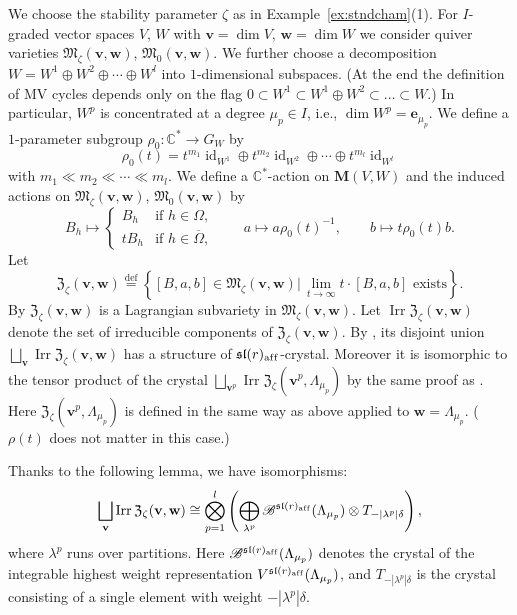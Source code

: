 \documentclass[pdftex]{sigma}
\theoremstyle{definition}
\numberwithin{equation}{section}
\newcommand{\defeq}{\overset{\operatorname{\scriptstyle def}}{=}}
\newcommand{\C}{{\mathbb C}}
\newcommand{\algsl}{\operatorname{\mathfrak{sl}}} %
\newcommand{\id}{\operatorname{id}}
\newcommand{\bM}{{\mathbf M}} %
\newcommand{\M}{{\mathfrak M}} %
\newcommand{\bv}{{\mathbf v}} %
\newcommand{\bw}{{\mathbf w}} %
\newcommand{\be}{{\mathbf e}}
\newcommand{\Irr}{\operatorname{Irr}}
\newcommand{\aff}{\mathrm{af\/f}}
\begin{document}
We choose the stability parameter $\zeta$ as in
Example~\ref{ex:stndcham}(1). For $I$-graded vector spaces $V$, $W$
with $\bv = \dim V$, $\bw = \dim W$ we
consider quiver varieties $\M_\zeta(\bv,\bw)$, $\M_0(\bv,\bw)$. We further
choose a decomposition
$W = W^1\oplus W^2\oplus \cdots \oplus W^l$ into $1$-dimensional
subspaces. (At the end the def\/inition of MV cycles depends only on the
f\/lag $0\subset W^1\subset W^1\oplus W^2 \subset \dots \subset W$.)
In particular, $W^p$ is concentrated at a degree $\mu_p\in I$, i.e.,
$\dim W^p = \be_{\mu_p}$.
%
We def\/ine a $1$-parameter subgroup $\rho_0\colon\C^*\to G_W$ by
\begin{equation*}
  \rho_0(t) = t^{m_1} \id_{W^1} \oplus t^{m_2} \id_{W^2} \oplus\cdots
  \oplus t^{m_l}\id_{W^l}
\end{equation*}
with $m_1 \ll m_2 \ll \cdots \ll m_l$. We def\/ine a $\C^*$-action on
$\bM(V,W)$ and the induced actions on $\M_\zeta(\bv,\bw)$, $\M_0(\bv,\bw)$ by
\begin{equation*}
   B_h \mapsto
   \begin{cases}
     B_h & \text{if $h\in\Omega$},
     \\
     t B_h & \text{if $h\in\overline\Omega$},
   \end{cases}
\qquad
   a \mapsto a \rho_0(t)^{-1},
\qquad
   b \mapsto t\rho_0(t)b.
\end{equation*}
Let
\begin{equation*}
  \mathfrak Z_\zeta(\bv,\bw) \defeq
  \left\{ [B,a,b]\in\M_\zeta(\bv,\bw) \big|\,
      \text{$\displaystyle\lim_{t\to \infty} t\cdot[B,a,b]$ exists}
       \right\}.
\end{equation*}
By \cite[\S~8]{Na-tensor} $\mathfrak Z_\zeta(\bv,\bw)$ is a Lagrangian
subvariety in $\M_\zeta(\bv,\bw)$.
%
Let $\Irr\mathfrak Z_\zeta(\bv,\bw)$ denote the set
of irreducible components of $\mathfrak Z_\zeta(\bv,\bw)$.
By \cite[\S~8]{Na-tensor}, its disjoint union
\(
   \bigsqcup_\bv \Irr\mathfrak Z_\zeta(\bv,\bw)
\)
has a structure of $\algsl(r)_\aff$-crystal. Moreover it is
isomorphic to the tensor product of the crystal
\(
   \bigsqcup_{\bv^p} \Irr\mathfrak Z_\zeta(\bv^p,\Lambda_{\mu_p})
\)
by the same proof as \cite[4.6]{Na-tensor}.
%
Here $\mathfrak Z_\zeta(\bv^p,\Lambda_{\mu_p})$ is def\/ined in the same
way as above applied to $\bw = \Lambda_{\mu_p}$. ($\rho(t)$ does not
matter in this case.)

Thanks to the following lemma, we have isomorphisms:
\begin{equation}\label{eq:tensor_Fock}
\begin{split}
  \bigsqcup_{\bv} \Irr\mathfrak Z_\zeta(\bv,\bw)
  \cong \bigotimes_{p=1}^l \left(
    \bigoplus_{\lambda^p}
  \mathscr B^{{\algsl}(r)_\aff}(\Lambda_{\mu_p})
  \otimes T_{-|\lambda^p|\delta}
  \right),
\end{split}
\end{equation}
where $\lambda^p$ runs over partitions. Here $\mathscr
B^{{\algsl}(r)_\aff}(\Lambda_{\mu_p})$ denotes the crystal of the
integrable highest weight representation
$V^{{\algsl}(r)_\aff}(\Lambda_{\mu_p})$, and $T_{-|\lambda^p|\delta}$
is the crystal consisting of a single element with weight
$-|\lambda^p|\delta$.
\end{document}
